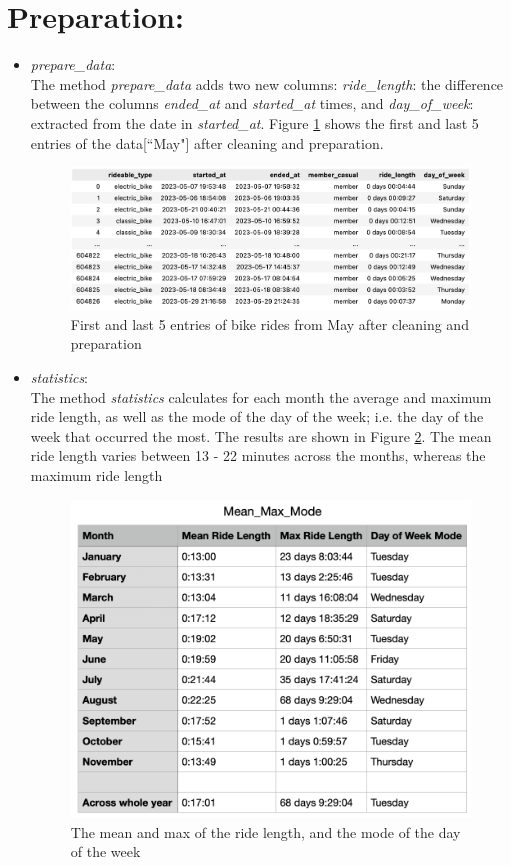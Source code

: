 \documentclass[12pt]{article}
\begin{document}
\section*{Preparation:}
\begin{itemize}
\item \textit{prepare\_data}:\\
	The method \textit{prepare\_data} adds two new columns: \textit{ride\_length}: the difference between the columns \textit{ended\_at} and \textit{started\_at} times, and \textit{day\_of\_week}: extracted from the date in \textit{started\_at}. Figure \ref{fig7} shows the first and last 5 entries of the data[``May"] after cleaning and preparation.

	\begin{figure}[h]
	\hspace{1cm}
	\includegraphics[width=5.8 in, height = 1.9 in]{imgMay2.png}
	\caption{First and last 5 entries of bike rides from May after cleaning and preparation}
	\label{fig7}
	\end{figure}
	
\item \textit{statistics}:\\	
	The method \textit{statistics} calculates for each month the average and maximum ride length, as well as the mode of the day of the week; i.e. the day of the week that occurred the most. The results are shown in Figure \ref{fig9}. The mean ride length varies between 13 - 22 minutes across the months, whereas the maximum ride length
	
	\begin{figure}[h]
	\centering
	\includegraphics[width=4 in, height = 3.2 in]{imgMeanMax.png}
	\caption{The mean and max of the ride length, and the mode of the day of the week}
	\label{fig9}
	\end{figure}
	
\end{itemize}
\end{document}
